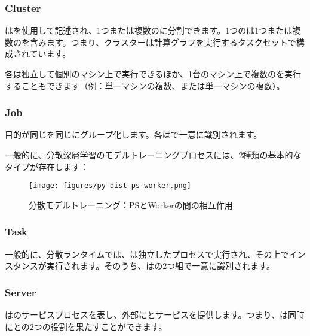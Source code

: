 \begin{content}
\subsubsection{Cluster}

はを使用して記述され、1つまたは複数のに分割できます。1つのは1つまたは複数のを含みます。つまり、クラスターは計算グラフを実行するタスクセットで構成されています。

各は独立して個別のマシン上で実行できるほか、1台のマシン上で複数のを実行することもできます（例：単一マシンの複数、または単一マシンの複数）。

\subsubsection{Job}

目的が同じを同じにグループ化します。各はで一意に識別されます。

一般的に、分散深層学習のモデルトレーニングプロセスには、2種類の基本的なタイプが存在します：

\begin{enum}
\end{enum}

\begin{figure}[H]
\centering
\texttt{[image: figures/py-dist-ps-worker.png]}
\caption{分散モデルトレーニング：PSとWorkerの間の相互作用}
 \label{fig:py-dist-ps-worker}
\end{figure}

\subsubsection{Task}

一般的に、分散ランタイムでは、は独立したプロセスで実行され、その上でインスタンスが実行されます。そのうち、はの2つ組で一意に識別されます。

\subsubsection{Server}

はのサービスプロセスを表し、外部にとサービスを提供します。つまり、は同時にとの2つの役割を果たすことができます。


\end{content}
